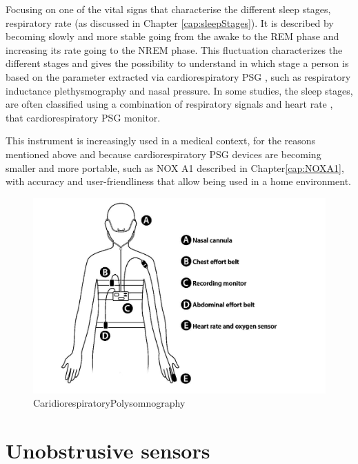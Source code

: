Focusing on one of the vital signs that characterise the different sleep stages, respiratory rate (as discussed in Chapter \ref{cap:sleepStages}). It is described by becoming slowly and more stable going from the awake to the REM phase and increasing its rate going to the NREM phase.
This fluctuation characterizes the different stages and gives the possibility to understand in which stage a person is based on the parameter extracted via cardiorespiratory PSG \cite{7318373}, such as respiratory inductance plethysmography and nasal pressure. In some studies, the sleep stages, are often classified using a combination of respiratory signals and heart rate \cite{1597499}, that cardiorespiratory PSG monitor.

This instrument is increasingly used in a medical context, for the reasons mentioned above and because cardiorespiratory PSG devices are
becoming smaller and more portable, such as NOX A1 described in Chapter\ref{cap:NOXA1}, with accuracy and user-friendliness that allow being used in a home environment.

\vspace{0.5cm}
\begin{figure}[h]
    \centering
    \includegraphics[width=\textwidth]{img/CardioPSG.jpg}
    \caption{CaridiorespiratoryPolysomnography}
    \label{fig:PSGCardio}
\end{figure}

\section{Unobstrusive sensors} \label{cap:unobstrusiveSensors}

